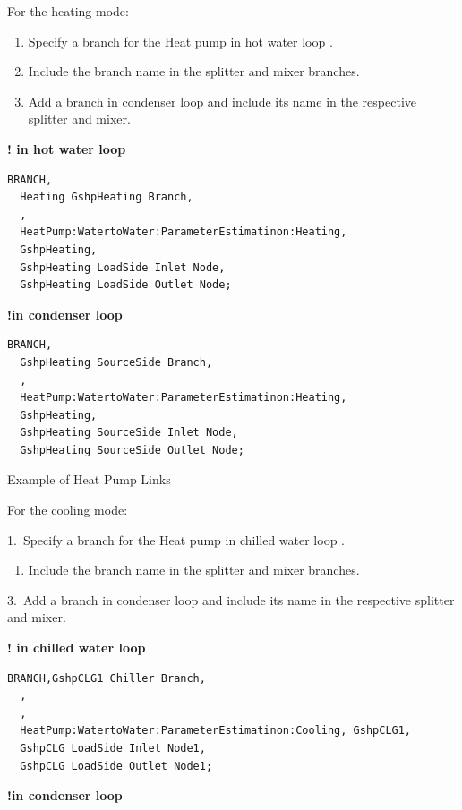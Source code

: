 For the heating mode:

\begin{enumerate}
    \def\labelenumi{\arabic{enumi}.}
    \item
    Specify a branch for the Heat pump in hot water loop .
    \item
    Include the branch name in the splitter and mixer branches.
    \item
    Add a branch in condenser loop and include its name in the respective splitter and mixer.
\end{enumerate}

\textbf{! in hot water loop}

\begin{lstlisting}
BRANCH,
  Heating GshpHeating Branch,
  ,
  HeatPump:WatertoWater:ParameterEstimatinon:Heating,
  GshpHeating,
  GshpHeating LoadSide Inlet Node,
  GshpHeating LoadSide Outlet Node;
\end{lstlisting}

\textbf{!in condenser loop}

\begin{lstlisting}
BRANCH,
  GshpHeating SourceSide Branch,
  ,
  HeatPump:WatertoWater:ParameterEstimatinon:Heating,
  GshpHeating,
  GshpHeating SourceSide Inlet Node,
  GshpHeating SourceSide Outlet Node;
\end{lstlisting}

Example of Heat Pump Links

For the cooling mode:

1.~Specify a branch for the Heat pump in chilled water loop .

\begin{enumerate}
    \def\labelenumi{\arabic{enumi}.}
    \setcounter{enumi}{1}
    \tightlist
    \item
    Include the branch name in the splitter and mixer branches.
\end{enumerate}

3.~Add a branch in condenser loop and include its name in the respective splitter and mixer.

\textbf{! in chilled water loop}

\begin{lstlisting}
BRANCH,GshpCLG1 Chiller Branch,
  ,
  ,
  HeatPump:WatertoWater:ParameterEstimatinon:Cooling, GshpCLG1,
  GshpCLG LoadSide Inlet Node1,
  GshpCLG LoadSide Outlet Node1;
\end{lstlisting}

\textbf{!in condenser loop}

